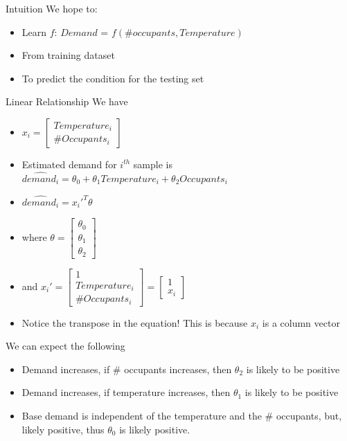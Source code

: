 \documentclass{beamer}
\begin{document}
\begin{frame}{Intuition}
    We hope to: 
    \begin{itemize}
        \item Learn $f$: $Demand$ = $f(\# occupants, Temperature)$
        \item From training dataset
        \item To predict the condition for the testing set
    \end{itemize}
\end{frame}


\begin{frame}{Linear Relationship}
    We have 
    \begin{itemize}[<+->]
    	\item $x_i = \begin{bmatrix}
    	Temperature_i\\\#Occupants_i
    	\end{bmatrix}$
        \item Estimated demand for $i^{th}$ sample is  $\hat{demand_{i}} = \theta_{0} + \theta_{1} Temperature_i + \theta_{2} Occupants_i$
        \item $\hat{demand_{i}} = x_{i}'^{T} \theta$
        \item where $\theta = \begin{bmatrix}\theta_0\\\theta_1\\ \theta_2
        \end{bmatrix}$
        \item and $x_{i}' = \begin{bmatrix}
        1\\Temperature_i\\\#Occupants_i
        \end{bmatrix} = \begin{bmatrix}
        1 \\ x_i
        \end{bmatrix}$
        \item Notice the transpose in the equation! This is because $x_{i}$ is a column vector
    \end{itemize}

\end{frame}





\begin{frame}{We can expect the following}
    \begin{itemize}
        \item<+-> Demand increases, if \# occupants increases, then $\theta_{2}$ is likely to be positive
        
        \item<+-> Demand increases, if temperature increases, then $\theta_{1}$ is likely to be positive
        
        \item<+-> Base demand is independent of the temperature and the \# occupants, but, likely positive, thus $\theta_0$ is likely positive.
        
    \end{itemize}
\end{frame}
\end{document}

